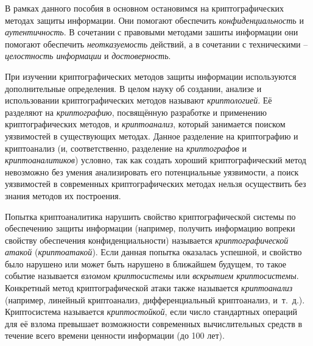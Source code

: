 В рамках данного пособия в основном остановимся на криптографических методах защиты информации. Они помогают обеспечить \emph{конфиденциальность} и \emph{аутентичность}. В сочетании с правовыми методами зашиты информации они помогают обеспечить \emph{неотказуемость} действий, а в сочетании с техническими -- \emph{целостность информации} и \emph{достоверность}.

При изучении криптографических методов защиты информации используются дополнительные определения. В целом науку об создании, анализе и использовании криптографических методов называют \emph{криптологией}. Её разделяют на \emph{криптографию}, посвящённую разработке и применению криптографических методов, и \emph{криптоанализ}, который занимается поиском уязвимостей в существующих методах. Данное разделение на криптографию и криптоанализ (и, соответственно, разделение на \emph{криптографов} и \emph{криптоаналитиков}) условно, так как создать хороший криптографический метод невозможно без умения анализировать его потенциальные уязвимости, а поиск уязвимостей в современных криптографических методах нельзя осуществить без знания методов их построения.

Попытка криптоаналитика нарушить свойство криптографической системы по обеспечению защиты информации (например, получить информацию вопреки свойству обеспечения конфиденциальности) называется \emph{криптографической атакой} (\emph{криптоатакой}). Если данная попытка оказалась успешной, и свойство было нарушено или может быть нарушено в ближайшем будущем, то такое событие называется \emph{взломом криптосистемы} или \emph{вскрытием криптосистемы}. Конкретный метод криптографической атаки также называется \emph{криптоанализ} (например, линейный криптоанализ, дифференциальный криптоанализ, и~т.~д.). Криптосистема называется \emph{криптостойкой}, если число стандартных операций для её взлома превышает возможности современных вычислительных средств в течение всего времени ценности информации (до 100 лет).

